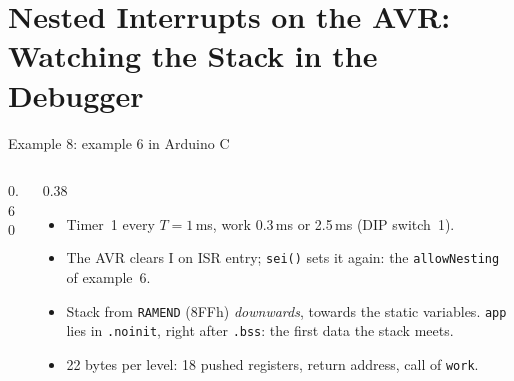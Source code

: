 \section{Nested Interrupts on the AVR: Watching the Stack in the Debugger}
\label{sec:avrnesting}

\begin{frame}[fragile]{Example 8: example 6 in Arduino C}
  \begin{columns}[T]
    \begin{column}{0.60\textwidth}

    \end{column}
    \begin{column}{0.38\textwidth}
      \footnotesize
      \begin{itemize}
        \item Timer~1 every $T = 1$\,ms, work 0.3\,ms or 2.5\,ms (DIP switch~1).
        \item The AVR clears I on ISR entry; \texttt{sei()} sets it again: the \texttt{allowNesting} of example~6.
        \item Stack from \texttt{RAMEND} (8FFh) \emph{downwards}, towards the static variables. \texttt{app} lies in \texttt{.noinit}, right after \texttt{.bss}: the first data the stack meets.
        \item 22 bytes per level: 18 pushed registers, return address, call of \texttt{work}.
      \end{itemize}
    \end{column}
  \end{columns}
\end{frame}

